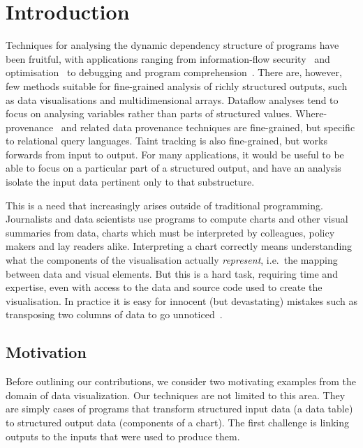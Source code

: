 \section{Introduction}

Techniques for analysing the dynamic dependency structure of programs have been fruitful, with applications ranging from information-flow security~\cite{sabelfeld03} and optimisation~\cite{kildall73} to debugging and program comprehension~\cite{weiser81,delucia96}. There are, however, few methods suitable for fine-grained analysis of richly structured outputs, such as data visualisations and multidimensional arrays. Dataflow analyses \cite{reps95} tend to focus on analysing variables rather than parts of structured values. Where-provenance~\cite{buneman01} and related data provenance techniques are fine-grained, but specific to relational query languages. Taint tracking \cite{newsome05} is also fine-grained, but works forwards from input to output. For many applications, it would be useful to be able to focus on a particular part of a structured output, and have an analysis isolate the input data pertinent only to that substructure.

This is a need that increasingly arises outside of traditional programming. Journalists and data scientists use programs to compute charts and other visual summaries from data, charts which must be interpreted by colleagues, policy makers and lay readers alike. Interpreting a chart correctly means understanding what the components of the visualisation actually \emph{represent}, i.e.~the mapping between data and visual elements. But this is a hard task, requiring time and expertise, even with access to the data and source code used to create the visualisation. In practice it is easy for innocent (but devastating) mistakes such as transposing two columns of data to go unnoticed~\cite{miller06}.


\subsection{Motivation}
\label{sec:introduction:motivation}
Before outlining our contributions, we consider two motivating examples from the domain of data visualization. Our techniques are not limited to this area. They are simply cases of programs that transform structured input data (a data table) to structured output data (components of a chart). The first challenge is linking outputs to the inputs that were used to produce them.

